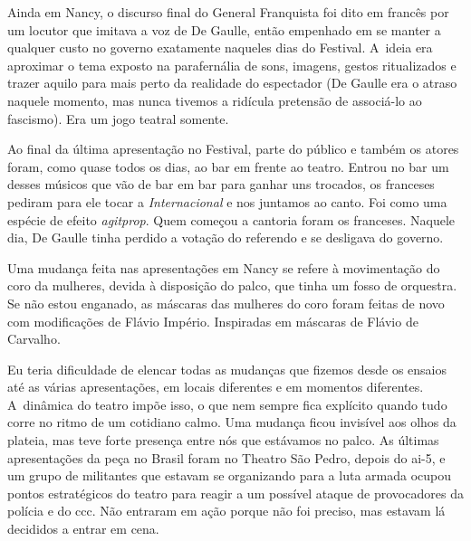 {Ainda em Nancy, o discurso final do General Franquista foi dito em
francês por um locutor que imitava a voz de De Gaulle, então empenhado
em se manter a qualquer custo no governo exatamente naqueles dias do
Festival. A~ideia era aproximar o tema exposto na parafernália de sons,
imagens, gestos ritualizados e trazer aquilo para mais perto da realidade
do espectador (De Gaulle era o atraso naquele momento, mas nunca tivemos
a ridícula pretensão de associá-lo ao fascismo). Era um jogo teatral
somente.

Ao final da última apresentação no Festival, parte do público e também os
atores foram, como quase todos os dias, ao bar em frente ao teatro.
Entrou no bar um desses músicos que vão de bar em bar para ganhar uns
trocados, os franceses pediram para ele tocar a {\it Internacional} e
nos juntamos ao canto. Foi como uma espécie de efeito {\it agitprop}. Quem
começou a cantoria foram os franceses. Naquele dia, De Gaulle tinha
perdido a votação do referendo e se desligava do governo.

Uma mudança feita nas apresentações em Nancy se refere à
movimentação do coro da mulheres, devida à disposição do palco, que tinha um
fosso de orquestra. Se não estou enganado, as máscaras das mulheres do
coro foram feitas de novo com modificações de Flávio Império.
Inspiradas em máscaras de Flávio de Carvalho.

Eu teria dificuldade de elencar todas as mudanças que fizemos desde os
ensaios até as várias apresentações, em locais diferentes e em momentos
diferentes. A~dinâmica do teatro impõe isso, o que nem sempre fica
explícito quando tudo corre no ritmo de um cotidiano calmo. Uma mudança
ficou invisível aos olhos da plateia, mas teve forte presença entre nós
que estávamos no palco. As últimas apresentações da peça no Brasil foram
no Theatro São Pedro, depois do {\sc ai}-5, e um grupo de
militantes que estavam se organizando para a luta armada ocupou pontos
estratégicos do teatro para reagir a um possível ataque de provocadores
da polícia e do {\sc ccc}. Não entraram em ação porque não foi preciso, mas
estavam lá decididos a entrar em cena.

}
